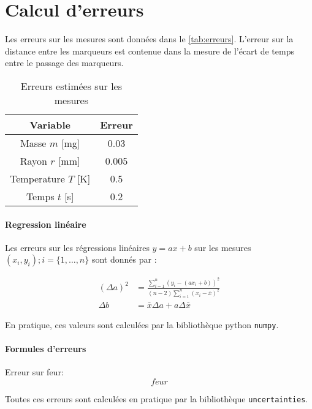 \section{Calcul d'erreurs}
\label{sec:erreurs}

Les erreurs sur les mesures sont données dans le \autoref{tab:erreurs}. L'erreur sur la distance entre les marqueurs est contenue dans la mesure de l'écart de temps entre le passage des marqueurs.

\begin{table}[h]
    \centering
    \begin{tabulary}{\textwidth}{C C}
        \toprule
        Variable & Erreur \\
        \midrule
        Masse \(m\) [\si{\milli\gram}] & 0.03 \\
        Rayon \(r\) [\si{\milli\meter}] & 0.005 \\
        Temperature \(T\) [\si{\kelvin}] & 0.5 \\
        Temps \(t\) [\si{\second}] & 0.2 \\
        \bottomrule
    \end{tabulary}
    \caption{Erreurs estimées sur les mesures}
    \label{tab:erreurs}
\end{table}

\paragraph*{Regression linéaire}
Les erreurs sur les régressions linéaires \(y = ax + b\) sur les mesures \((x_i, y_i) ; i = \{1, \dots, n\}\) sont donnés par \cite{erreursmesure}:

\begin{equation}
    \label{eq:erreur:fit}
    \begin{aligned}
        (\Delta a)^2 &= \frac{\sum_{i=1}^{n}(y_i - (a x_i + b))^2}{(n-2) \sum_{i=1}^{n}(x_i - \bar{x})^2}\\
        \Delta b &= \bar{x} \Delta a + a \Delta \bar{x}
    \end{aligned}
\end{equation}

En pratique, ces valeurs sont calculées par la bibliothèque python \texttt{numpy}.

\paragraph*{Formules d'erreurs}

Erreur sur feur:
\begin{equation}
    feur
\end{equation}

Toutes ces erreurs sont calculées en pratique par la bibliothèque \texttt{uncertainties}.
